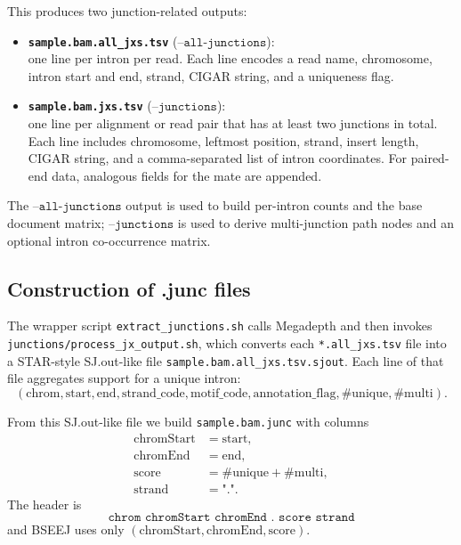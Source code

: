 \documentclass[11pt]{article}
\begin{document}
This produces two junction-related outputs:
\begin{itemize}
  \item \textbf{\texttt{sample.bam.all\_jxs.tsv}} (\(\texttt{--all-junctions}\)):\\
  one line per intron per read. Each line encodes a read name, chromosome,
  intron start and end, strand, CIGAR string, and a uniqueness flag.
  \item \textbf{\texttt{sample.bam.jxs.tsv}} (\(\texttt{--junctions}\)):\\
  one line per alignment or read pair that has at least two junctions in
  total. Each line includes chromosome, leftmost position, strand, insert
  length, CIGAR string, and a comma-separated list of intron coordinates.
  For paired-end data, analogous fields for the mate are appended.
\end{itemize}

The \(\texttt{--all-junctions}\) output is used to build per-intron counts
and the base document matrix; \(\texttt{--junctions}\) is used to derive
multi-junction path nodes and an optional intron co-occurrence matrix.

\subsection{Construction of .junc files}

The wrapper script \texttt{extract\_junctions.sh} calls Megadepth and then
invokes \texttt{junctions/process\_jx\_output.sh}, which converts each
\texttt{*.all\_jxs.tsv} file into a STAR-style SJ.out-like file
\texttt{sample.bam.all\_jxs.tsv.sjout}. Each line of that file aggregates
support for a unique intron:
\[
  (\text{chrom}, \text{start}, \text{end}, \text{strand\_code},
   \text{motif\_code}, \text{annotation\_flag}, \#\text{unique}, \#\text{multi}).
\]

From this SJ.out-like file we build \texttt{sample.bam.junc} with columns
\begin{align*}
  \text{chromStart} &= \text{start}, \\
  \text{chromEnd}   &= \text{end}, \\
  \text{score}      &= \#\text{unique} + \#\text{multi}, \\
  \text{strand}     &= \text{"."}.
\end{align*}
The header is
\[
  \texttt{chrom\ chromStart\ chromEnd\ .\ score\ strand}
\]
and BSEEJ uses only \((\text{chromStart},\text{chromEnd},\text{score})\).
\end{document}
